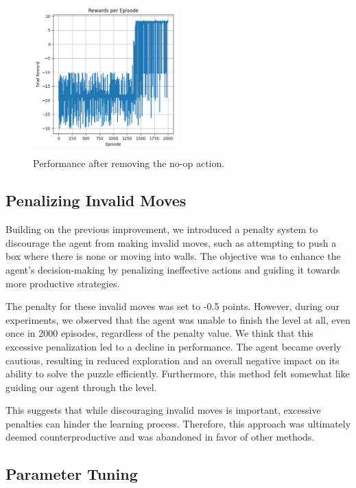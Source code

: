 \documentclass[10pt,twocolumn]{article}
\begin{document}
\begin{figure}[ht]
    \centering
    \includegraphics[width=0.5\textwidth,height=6cm]{Images/performance_no_op.png}
    \caption{Performance after removing the no-op action.}
    \label{fig:performance_no_op}
\end{figure}

\subsection{Penalizing Invalid Moves}

Building on the previous improvement, we introduced a penalty system to discourage the agent from making invalid moves, such as attempting to push a box where there is none or moving into walls. The objective was to enhance the agent's decision-making by penalizing ineffective actions and guiding it towards more productive strategies.

The penalty for these invalid moves was set to -0.5 points. However, during our experiments, we observed that the agent was unable to finish the level at all, even once in 2000 episodes, regardless of the penalty value. We think that this excessive penalization led to a decline in performance. The agent became overly cautious, resulting in reduced exploration and an overall negative impact on its ability to solve the puzzle efficiently. Furthermore, this method felt somewhat like guiding our agent through the level.

This suggests that while discouraging invalid moves is important, excessive penalties can hinder the learning process. Therefore, this approach was ultimately deemed counterproductive and was abandoned in favor of other methods.

\subsection{Parameter Tuning}
\end{document}
